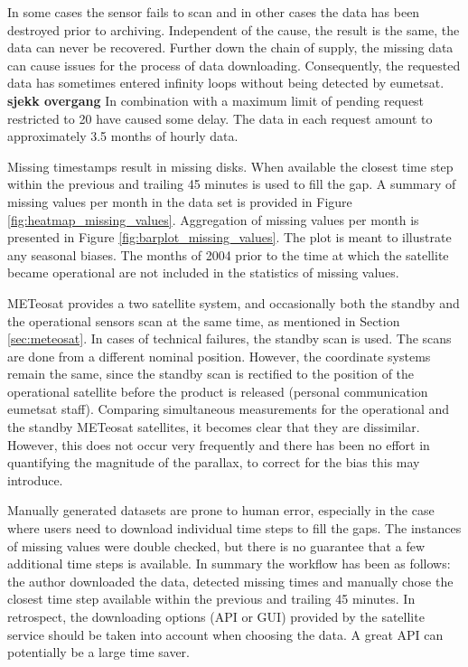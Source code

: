 In some cases the sensor fails to scan and in other cases the data has been destroyed prior to archiving. Independent of the cause, the result is the same, the data can never be recovered. Further down the chain of supply, the missing data can cause issues for the process of data downloading. Consequently, the requested data has sometimes entered infinity loops without being detected by \acrshort{eumetsat}. \textbf{sjekk overgang} In combination with 
a maximum limit of pending request restricted to 20 have caused some delay. The data in each request amount to approximately 3.5 months of hourly data. 

Missing timestamps result in missing disks. When available the closest time step within the previous and trailing 45 minutes is used to fill the gap. A summary of missing values per month in the data set is provided in Figure \ref{fig:heatmap_missing_values}. Aggregation of missing values per month is presented in Figure \ref{fig:barplot_missing_values}. The plot is meant to illustrate any seasonal biases. The months of 2004 prior to the time at which the satellite became operational are not included in the statistics of missing values.

METeosat provides a two satellite system, and occasionally both the standby and the operational sensors scan at the same time, as mentioned in Section \ref{sec:meteosat}.
In cases of technical failures, the standby scan is used. The scans are done from a different nominal position. However, the coordinate systems remain the same, since the standby scan is rectified to the position of the operational satellite before the product is released (personal communication \acrshort{eumetsat} staff). Comparing simultaneous measurements for the operational and the standby METeosat satellites, it becomes clear that they are dissimilar. However, this does not occur very frequently and there has been no effort in quantifying the magnitude of the parallax, to correct for the bias this may introduce.

Manually generated datasets are prone to human error, especially in the case where users need to download individual time steps to fill the gaps. The instances of missing values were double checked, but there is no guarantee that a few additional time steps is available. In summary the workflow has been as follows: the author downloaded the data, detected missing times and manually chose the closest time step available within the previous and trailing 45 minutes. In retrospect, the downloading options (API or GUI) provided by the satellite service should be taken into account when choosing the data. A great API can potentially be a large time saver.


